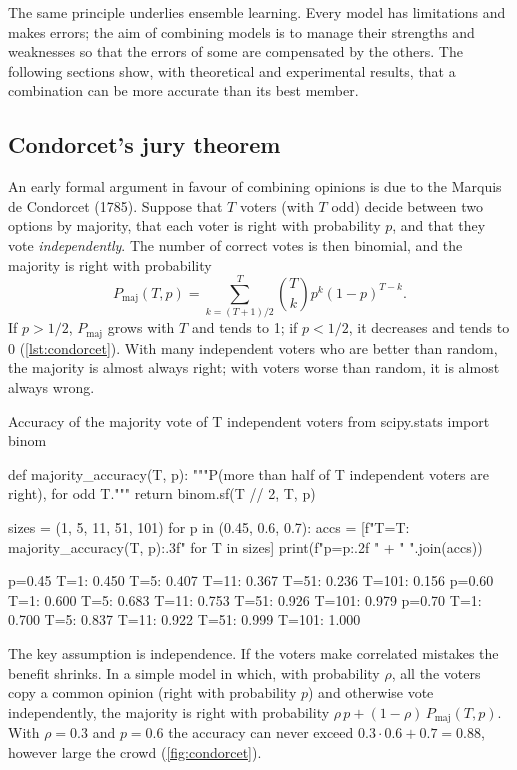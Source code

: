 The same principle underlies ensemble learning. Every model has limitations and makes errors;
the aim of combining models is to manage their strengths and weaknesses so that the errors of
some are compensated by the others. The following sections show, with theoretical and experimental results, that a
combination can be more accurate than its best member.

\subsection{Condorcet's jury theorem}

An early formal argument in favour of combining opinions is due to the Marquis de Condorcet
(1785). Suppose that $T$ voters (with $T$ odd) decide between two options by majority, that each
voter is right with probability $p$, and that they vote \emph{independently}. The number of
correct votes is then binomial, and the majority is right with probability
\begin{equation}\label{eq:condorcet}
  P_{\text{maj}}(T,p)=\sum_{k=(T+1)/2}^{T}\binom{T}{k}p^k(1-p)^{T-k}.
\end{equation}
If $p>1/2$, $P_{\text{maj}}$ grows with $T$ and tends to 1; if $p<1/2$, it decreases and tends to 0
(\cref{lst:condorcet}). With many independent voters who are better than random, the majority is almost
always right; with voters worse than random, it is almost always wrong.

\begin{pylisting}[label={lst:condorcet}]{Accuracy of the majority vote of T independent voters}
from scipy.stats import binom

def majority_accuracy(T, p):
    """P(more than half of T independent voters are right), for odd T."""
    return binom.sf(T // 2, T, p)

sizes = (1, 5, 11, 51, 101)
for p in (0.45, 0.6, 0.7):
    accs = [f"T={T}: {majority_accuracy(T, p):.3f}" for T in sizes]
    print(f"p={p:.2f}  " + "  ".join(accs))
\end{pylisting}
\begin{pyoutput}
p=0.45  T=1: 0.450  T=5: 0.407  T=11: 0.367  T=51: 0.236  T=101: 0.156
p=0.60  T=1: 0.600  T=5: 0.683  T=11: 0.753  T=51: 0.926  T=101: 0.979
p=0.70  T=1: 0.700  T=5: 0.837  T=11: 0.922  T=51: 0.999  T=101: 1.000
\end{pyoutput}

The key assumption is independence. If the voters make correlated mistakes the benefit
shrinks. In a simple model in which, with probability $\rho$, all the voters copy a common
opinion (right with probability $p$) and otherwise vote independently, the majority is right
with probability $\rho\,p+(1-\rho)\,P_{\text{maj}}(T,p)$. With $\rho=0.3$ and $p=0.6$ the accuracy
can never exceed $0.3\cdot0.6+0.7=0.88$, however large the crowd (\cref{fig:condorcet}).

